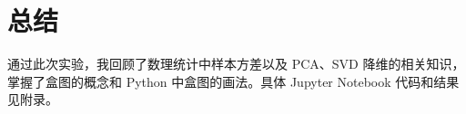 \documentclass[12pt,AutoFakeBold]{article}
\begin{document}
\section{总结}

通过此次实验，我回顾了数理统计中样本方差以及 PCA、SVD 降维的相关知识，掌握了盒图的概念和 Python 中盒图的画法。具体 Jupyter Notebook 代码和结果见附录。






%  
\end{document}
